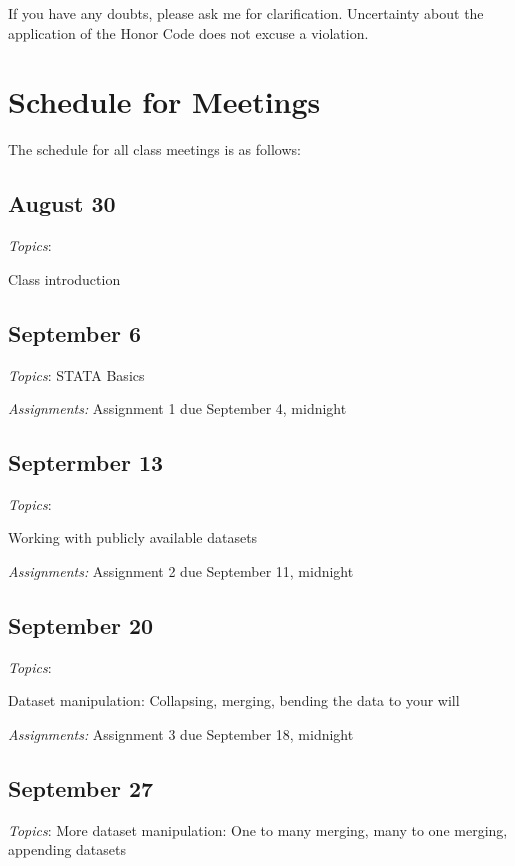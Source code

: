 \documentclass[12pt]{article}
\begin{document}
If you have any doubts, please ask me for clarification. Uncertainty
about the application of the Honor Code does not excuse a violation.

\section{Schedule for Meetings}

The schedule for all class meetings is as follows:

\begin{flushleft}

\subsection{August 30}

\textit{Topics}:

Class introduction

\subsection{September 6}


\textit{Topics}:
STATA Basics

\textit {Assignments:}
Assignment 1 due September 4, midnight

\subsection{Septermber 13}

\textit{Topics}:

Working with publicly available datasets

\textit {Assignments:}
Assignment 2 due September 11, midnight

\subsection{September 20}


\textit{Topics}:

Dataset manipulation: Collapsing, merging, bending the data to your will


\textit {Assignments:}
Assignment 3 due September 18, midnight
\subsection{September 27}


\textit{Topics}:
More dataset manipulation: One to many merging, many to one merging, appending datasets


\end{flushleft}
\end{document}
